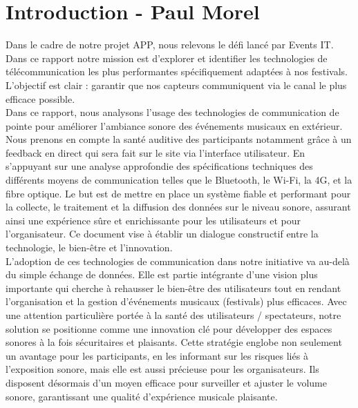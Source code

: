 \documentclass[12]{article}
\begin{document}
\begin{titlepage}

\end{titlepage}

\newpage
\tableofcontents
\listoffigures
\newpage
\clearpage
\setcounter{page}{1}


\section*{Introduction - Paul Morel} 
Dans le cadre de notre projet APP, nous relevons le défi lancé par Events IT. Dans ce rapport notre mission est d’explorer et identifier les technologies de télécommunication les plus performantes spécifiquement adaptées à nos festivals. L'objectif est clair : garantir que nos capteurs communiquent via le canal le plus efficace possible. \\

Dans ce rapport, nous analysons l'usage des technologies de communication de pointe pour améliorer l'ambiance sonore des événements musicaux en extérieur. Nous prenons en compte la santé auditive des participants notamment grâce à un feedback en direct qui sera fait sur le site via l'interface utilisateur. En s'appuyant sur une analyse approfondie des spécifications techniques des différents moyens de communication telles que le Bluetooth, le Wi-Fi, la 4G, et la fibre optique. Le but est de mettre en place un système fiable et performant pour la collecte, le traitement et la diffusion des données sur le niveau sonore, assurant ainsi une expérience sûre et enrichissante pour les utilisateurs et pour l'organisateur. Ce document vise à établir un dialogue constructif entre la technologie, le bien-être et l'innovation. \\

L'adoption de ces technologies de communication dans notre initiative va au-delà du simple échange de données. Elle est partie intégrante d'une vision plus importante qui cherche à rehausser le bien-être des utilisateurs tout en rendant l'organisation et la gestion d'événements musicaux (festivals) plus efficaces. Avec une attention particulière portée à la santé des utilisateurs / spectateurs, notre solution se positionne comme une innovation clé pour développer des espaces sonores à la fois sécuritaires et plaisants. Cette stratégie englobe non seulement un avantage pour les participants, en les informant sur les risques liés à l'exposition sonore, mais elle est aussi précieuse pour les organisateurs. Ils disposent désormais d'un moyen efficace pour surveiller et ajuster le volume sonore, garantissant une qualité d'expérience musicale plaisante. \\
\end{document}
